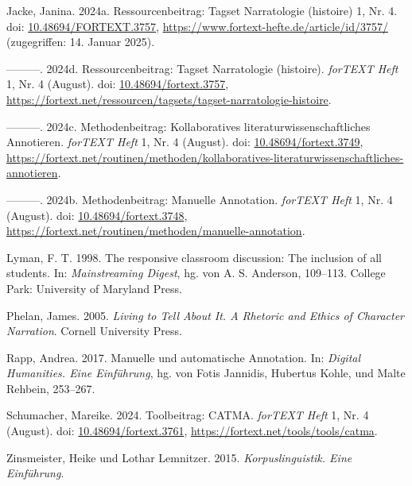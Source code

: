\documentclass[
          a4paper,
        ]{article}
\newlength{\cslhangindent}
\newenvironment{CSLReferences}[2] %
 {\begin{list}{}{%
  \setlength{\itemindent}{0pt}
  \setlength{\leftmargin}{0pt}
  \setlength{\parsep}{0pt}
  \ifodd #1
   \setlength{\leftmargin}{\cslhangindent}
   \setlength{\itemindent}{-1\cslhangindent}
  \fi
  \setlength{\itemsep}{#2\baselineskip}}}
 {\end{list}}
\begin{document}
\begin{CSLReferences}{1}{0}
Jacke, Janina. 2024a. Ressourcenbeitrag: {Tagset} {Narratologie}
(histoire) 1, Nr. 4. doi:
\href{https://doi.org/10.48694/FORTEXT.3757}{10.48694/FORTEXT.3757},
\url{https://www.fortext-hefte.de/article/id/3757/} (zugegriffen: 14.
Januar 2025).

---------. 2024d. Ressourcenbeitrag: {Tagset} {Narratologie} (histoire).
\emph{forTEXT Heft} 1, Nr. 4 (August). doi:
\href{https://doi.org/10.48694/fortext.3757}{10.48694/fortext.3757},
\url{https://fortext.net/ressourcen/tagsets/tagset-narratologie-histoire}.

---------. 2024c. Methodenbeitrag: {Kollaboratives}
literaturwissenschaftliches {Annotieren}. \emph{forTEXT Heft} 1, Nr. 4
(August). doi:
\href{https://doi.org/10.48694/fortext.3749}{10.48694/fortext.3749},
\url{https://fortext.net/routinen/methoden/kollaboratives-literaturwissenschaftliches-annotieren}.

---------. 2024b. Methodenbeitrag: {Manuelle} {Annotation}.
\emph{forTEXT Heft} 1, Nr. 4 (August). doi:
\href{https://doi.org/10.48694/fortext.3748}{10.48694/fortext.3748},
\url{https://fortext.net/routinen/methoden/manuelle-annotation}.

Lyman, F. T. 1998. The responsive classroom discussion: {The} inclusion
of all students. In: \emph{Mainstreaming {Digest}}, hg. von A. S.
Anderson, 109--113. College Park: University of Maryland Press.

Phelan, James. 2005. \emph{Living to Tell About It. A Rhetoric and
Ethics of Character Narration}. Cornell University Press.

Rapp, Andrea. 2017. Manuelle und automatische {Annotation}. In:
\emph{Digital {Humanities}. {Eine} {Einführung}}, hg. von Fotis
Jannidis, Hubertus Kohle, und Malte Rehbein, 253--267.

Schumacher, Mareike. 2024. Toolbeitrag: {CATMA}. \emph{forTEXT Heft} 1,
Nr. 4 (August). doi:
\href{https://doi.org/10.48694/fortext.3761}{10.48694/fortext.3761},
\url{https://fortext.net/tools/tools/catma}.

Zinsmeister, Heike und Lothar Lemnitzer. 2015. \emph{Korpuslinguistik.
{Eine} {Einführung}}.

\end{CSLReferences}
\end{document}
